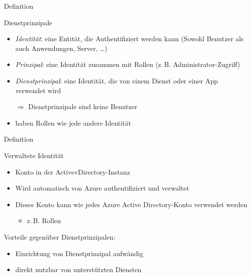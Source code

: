 \documentclass{scrartcl}
\newenvironment{flashcard}[2][]{%
    #1
    \vfill
    \centerline{\Large{#2}}
    \vfill
    \newpage
}
{\newpage}
\begin{document}
    \begin{flashcard}[Definition]{Dienstprinzipale}
            \begin{itemize}
                \item \emph{Identität}: eine Entität, die Authentifiziert werden kann \newline
                    (Sowohl Benutzer als auch Anwendungen, Server, …)
                \item \emph{Prinzipal}: eine Identität zusammen mit Rollen \newline
                    (z.\,B. Administrator-Zugriff)
                \item \emph{Dienstprinzipal}: eine Identität, die von einem Dienst oder einer App verwendet wird
                \item[$\Rightarrow $] Dienstprinzipale sind keine Benutzer
                \item haben Rollen wie jede andere Identität
            \end{itemize}
    \end{flashcard}

    \begin{flashcard}[Definition]{Verwaltete Identität}
            \begin{itemize}
                \item Konto in der ActivevDirectory-Instanz
                \item Wird automatisch von Azure authentifiziert und verwaltet
                \item Dieses Konto kann wie jedes Azure Active Directory-Konto verwendet werden
                    \begin{itemize}
                        \item z.\,B. Rollen
                    \end{itemize}
            \end{itemize}
            Vorteile gegenüber Dienstprinzipalen:
            \begin{itemize}
                \item Einrichtung von Dienstprinzipal aufwändig
                \item direkt nutzbar von unterstützten Diensten
            \end{itemize}
    \end{flashcard}
\end{document}

